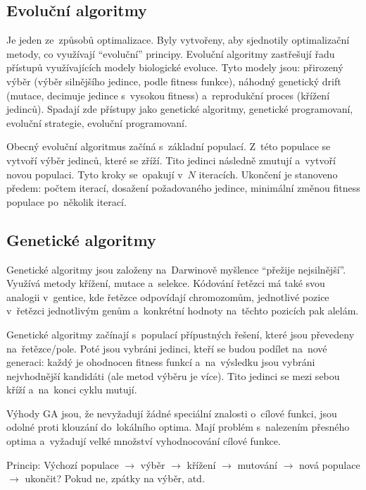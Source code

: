 \subsection{Evoluční algoritmy}

Je jeden ze~způsobů optimalizace. Byly vytvořeny, aby sjednotily optimalizační metody, co využívají \enquote{evoluční} principy. Evoluční algoritmy zastřešují řadu přístupů využívajících modely biologické evoluce. Tyto modely jsou: přirozený výběr (výběr silnějšího jedince, podle fitness funkce), náhodný genetický drift (mutace, decimuje jedince s~vysokou fitness) a~reprodukční proces (křížení jedinců). Spadají zde přístupy jako genetické algoritmy, genetické programovaní, evoluční strategie, evoluční programovaní.

Obecný evoluční algoritmus začíná s~základní populací. Z~této populace se vytvoří výběr jedinců, které se zříží. Tito jedinci následně zmutují a~vytvoří novou populaci. Tyto kroky se~opakují v~\( N \) iteracích. Ukončení je stanoveno předem: počtem iterací, dosažení požadovaného jedince, minimální změnou fitness populace po~několik iterací.

\subsection{Genetické algoritmy}

Genetické algoritmy jsou založeny na~Darwinově myšlence \enquote{přežije nejsilnější}. Využívá metody křížení, mutace a~selekce. Kódování řetězci má také svou analogii v~gentice, kde řetězce odpovídají chromozomům, jednotlivé pozice v~řetězci jednotlivým genům a~konkrétní hodnoty na~těchto pozicích pak alelám.

Genetické algoritmy začínají s~populací přípustných řešení, které jsou převedeny na~řetězce/pole. Poté jsou vybráni jedinci, kteří se budou podílet na~nové generaci: každý je ohodnocen fitness funkcí a~na~výsledku jsou vybráni nejvhodnější kandidáti (ale metod výběru je více). Tito jedinci se mezi sebou kříží a~na~konci cyklu mutují.

Výhody GA jsou, že nevyžadují žádné speciální znalosti o~cílové funkci, jsou odolné proti klouzání do~lokálního optima. Mají problém s~nalezením přesného optima a~vyžadují velké množství vyhodnocování cílové funkce.

Princip: Výchozí populace \(\rightarrow\) výběr \(\rightarrow\) křížení \(\rightarrow\) mutování \(\rightarrow\) nová populace \(\rightarrow\) ukončit? Pokud ne, zpátky na výběr, atd.

